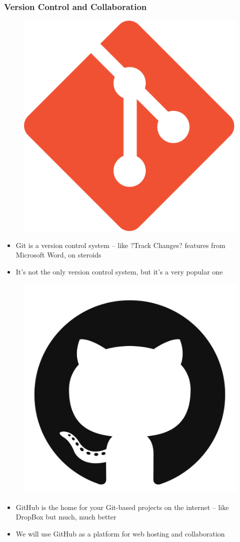 \documentclass[11pt]{beamer}
\begin{document}
		

	


\begin{frame}
	
	
	\frametitle{\textbf{Version Control and Collaboration}}
	
	\begin{minipage}[t]{0.5\linewidth}
		\vspace{-1em}
		\begin{figure}
			\centering
			\includegraphics[width=0.2\linewidth]{Images/S1/git-logo}
			\label{fig:r-logo}
		\end{figure}
		
		\begin{itemize}
			\item Git is a version control system -- like ?Track Changes? features from Microsoft Word, on steroids
			\item It's not the only version control system, but it's a very popular one
		\end{itemize}   
	\end{minipage}%
	\begin{minipage}[t]{0.5\linewidth}
		\vspace{-1em}
		\begin{figure}
			\centering
			\includegraphics[width=0.25\linewidth]{Images/S1/GitHub}
			\label{fig:rstudiologo}
		\end{figure}
		\vspace{-1em}
		\begin{itemize}
			\item GitHub is the home for your Git-based projects on the internet -- like DropBox but much, much better
			\item We will use GitHub as a platform for web hosting and collaboration
		\end{itemize}   
		
	\end{minipage}
\end{frame}
\end{document}
